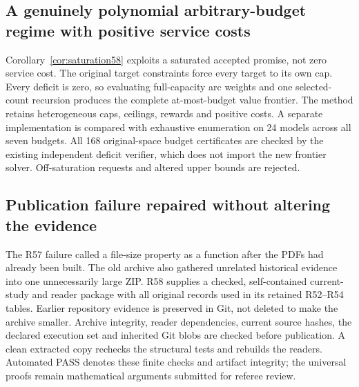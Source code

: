 \subsection{A genuinely polynomial arbitrary-budget regime with positive service costs}
Corollary~\ref{cor:saturation58} exploits a saturated accepted promise, not zero service cost. The original target constraints force every target to its own cap. Every deficit is zero, so evaluating full-capacity arc weights and one selected-count recursion produces the complete at-most-budget value frontier. The method retains heterogeneous caps, ceilings, rewards and positive costs. A separate implementation is compared with exhaustive enumeration on 24 models across all seven budgets. All 168 original-space budget certificates are checked by the existing independent deficit verifier, which does not import the new frontier solver. Off-saturation requests and altered upper bounds are rejected.

\subsection{Publication failure repaired without altering the evidence}
The R57 failure called a file-size property as a function after the PDFs had already been built. The old archive also gathered unrelated historical evidence into one unnecessarily large ZIP. R58 supplies a checked, self-contained current-study and reader package with all original records used in its retained R52--R54 tables. Earlier repository evidence is preserved in Git, not deleted to make the archive smaller. Archive integrity, reader dependencies, current source hashes, the declared execution set and inherited Git blobs are checked before publication. A clean extracted copy rechecks the structural tests and rebuilds the readers. Automated PASS denotes these finite checks and artifact integrity; the universal proofs remain mathematical arguments submitted for referee review.
